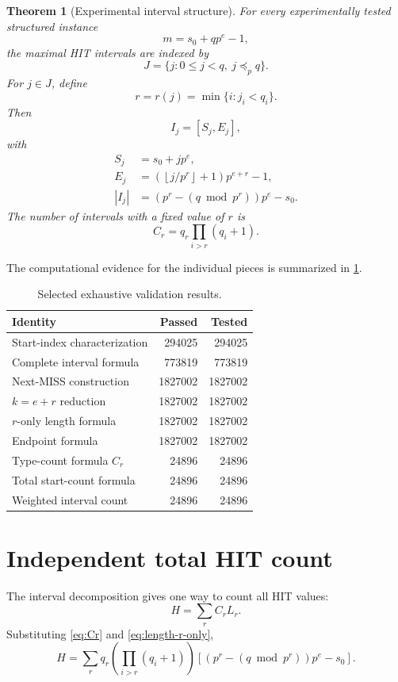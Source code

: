 \documentclass[11pt,a4paper]{article}
\newtheorem{theorem}{Theorem}[section]
\theoremstyle{definition}
\theoremstyle{remark}
\newcommand{\floor}[1]{\left\lfloor #1\right\rfloor}
\begin{document}
\begin{theorem}[Experimental interval structure]
For every experimentally tested structured instance
\[
 m=s_0+qp^e-1,
\]
the maximal HIT intervals are indexed by
\[
 J=\{j:0\le j<q,\ j\preceq_p q\}.
\]
For $j\in J$, define
\[
 r=r(j)=\min\{i:j_i<q_i\}.
\]
Then
\begin{equation}
 I_j=[S_j,E_j],
\end{equation}
with
\begin{align}
 S_j&=s_0+jp^e,
 \label{eq:complete-start}\\
 E_j&=\left(\floor{j/p^r}+1\right)p^{e+r}-1,
 \label{eq:complete-end}\\
 |I_j|&=\left(p^r-(q\bmod p^r)\right)p^e-s_0.
 \label{eq:complete-length}
\end{align}
The number of intervals with a fixed value of $r$ is
\[
 C_r=q_r\prod_{i>r}(q_i+1).
\]
\end{theorem}

The computational evidence for the individual pieces is summarized in \cref{tab:validation}.

\begin{table}[ht]
\centering
\caption{Selected exhaustive validation results.}
\label{tab:validation}
\begin{tabular}{@{}lrr@{}}
\toprule
Identity & Passed & Tested \\
\midrule
Start-index characterization & 294025 & 294025 \\
Complete interval formula & 773819 & 773819 \\
Next-MISS construction & 1827002 & 1827002 \\
$k=e+r$ reduction & 1827002 & 1827002 \\
$r$-only length formula & 1827002 & 1827002 \\
Endpoint formula & 1827002 & 1827002 \\
Type-count formula $C_r$ & 24896 & 24896 \\
Total start-count formula & 24896 & 24896 \\
Weighted interval count & 24896 & 24896 \\
\bottomrule
\end{tabular}
\end{table}

\section{Independent total HIT count}

The interval decomposition gives one way to count all HIT values:
\begin{equation}
 H
 =
 \sum_r C_rL_r.
 \label{eq:weighted-HIT}
\end{equation}
Substituting \eqref{eq:Cr} and \eqref{eq:length-r-only},
\begin{equation}
 \boxed{
 H
 =
 \sum_r
 q_r\left(\prod_{i>r}(q_i+1)\right)
 \left[
 \left(p^r-(q\bmod p^r)\right)p^e-s_0
 \right].
 }
 \label{eq:weighted-explicit}
\end{equation}
\end{document}
